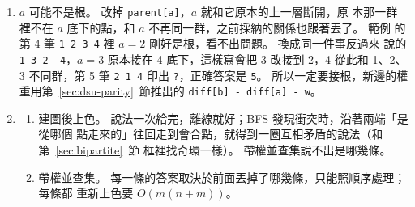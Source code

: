 \begin{enumerate}
\item $a$ 可能不是根。 改掉 \texttt{parent[a]}，$a$ 就和它原本的上一層斷開，原
本那一群裡不在 $a$ 底下的點，和 $a$ 不再同一群，之前採納的關係也跟著丟了。 範例
的第 4 筆 \texttt{1 2 3 4} 裡 $a = 2$ 剛好是根，看不出問題。 換成同一件事反過來
說的 \texttt{1 3 2 -4}，$a = 3$ 原本接在 4 底下，這樣寫會把 3 改接到 2，4 從此和
1、2、3 不同群，第 5 筆 \texttt{2 1 4} 印出 \texttt{?}，正確答案是 \texttt{5}。
所以一定要接根，新邊的權重用第~\ref{sec:dsu-parity}~節推出的
\texttt{diff[b] - diff[a] - w}。

\item
\begin{enumerate}
\item 建圖後上色。 說法一次給完，離線就好；BFS 發現衝突時，沿著兩端「是從哪個
點走來的」往回走到會合點，就得到一圈互相矛盾的說法（和第~\ref{sec:bipartite}~節
框裡找奇環一樣）。 帶權並查集說不出是哪幾條。
\item 帶權並查集。 每一條的答案取決於前面丟掉了哪幾條，只能照順序處理；每條都
重新上色要 $O(m(n + m))$。
\end{enumerate}
\end{enumerate}
